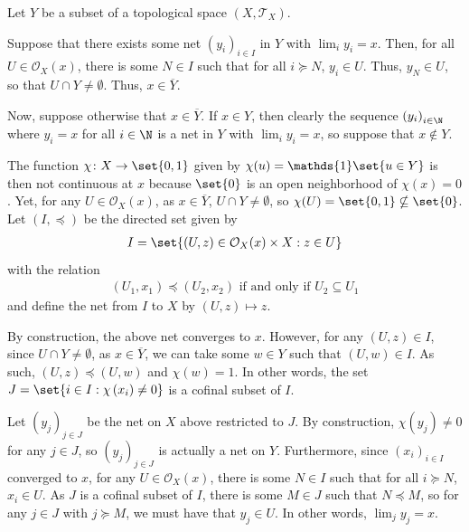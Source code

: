 \documentclass[10pt]{mypackage}
\begin{document}
\begin{solution}
  Let $Y$ be a subset of a topological space $(X,\mathcal T_X)$.

Suppose that there exists some net $\left(y_i\right)_{i\in I}$ in $Y$ with $\lim_iy_i=x$. Then, for all $U\in \mathcal{O}_X(x)$, there is some $N\in I$ such that for all $i\succeq N $, $ y_i\in U$. Thus, $y_N\in U $, so that $ U\cap Y \neq \emptyset $. Thus, $ x\in \overline{Y}$.

Now, suppose otherwise that $x\in \overline{Y}$. If $x \in Y$, then clearly the sequence $\left(y_i\right)_{i\in\N}$ where $y_i = x$ for all $i\in\N$ is a net in $Y$ with $\lim_iy_i=x$, so suppose that $x \notin Y$. 

The function $\chi\colon X\to\set{0,1}$ given by $\chi(u) = \mathds{1}\set{u\in Y}$ is then not continuous at $x$ because $\set{0}$ is an open neighborhood of $\chi(x) = 0$. Yet, for any $U \in \mathcal{O}_X(x)$, as $x\in \overline{Y}$, $U\cap Y \neq \emptyset $, so $ \chi(U) = \set{0,1} \nsubseteq \set{0}$.
Let $(I,\preceq)$ be the directed set given by 
\begin{align*}
   I = \set{\left(U,z\right) \in \mathcal{O}_X(x)\times X: z\in U} 
\end{align*}
with the relation
\begin{align*}
   \left(U_1,x_1\right) \preceq \left(U_2,x_2\right) \text{ if and only if } U_2\subseteq U_1 
\end{align*}
and define the net from $I$ to $X$ by $\left(U,z\right)\mapsto z$.

By construction, the above net converges to $x$. However, for any $\left(U,z\right)\in I$, since $U\cap Y \neq \emptyset$, as $x\in\overline{Y}$, we can take some $w\in Y$ such that $\left(U,w\right)\in I$. As such, $(U,z)\preceq (U,w)$ and $\chi(w) = 1$. In other words, the set $J = \set{i\in I: \chi\left(x_i\right) \neq 0}$ is a cofinal subset of $I$.

Let $\left(y_j\right)_{j\in J}$ be the net on $X$ above restricted to $J$. By construction, $\chi\left(y_j\right) \neq 0$ for any $j\in J$, so $\left(y_j\right)_{j\in J}$ is actually a net on $Y$. Furthermore, since $\left(x_i\right)_{i\in I}$ converged to $x$, for any $U \in \mathcal{O}_X(x)$, there is some $N\in I$ such that for all $i\succeq N $, $ x_i\in U$. As $J$ is a cofinal subset of $I$, there is some $M \in J$ such that $N \preceq M$, so for any $j\in J$ with $j \succeq M$, we must have that $y_j\in U$. In other words, $\lim_jy_j= x$.
\end{solution}
\end{document}
